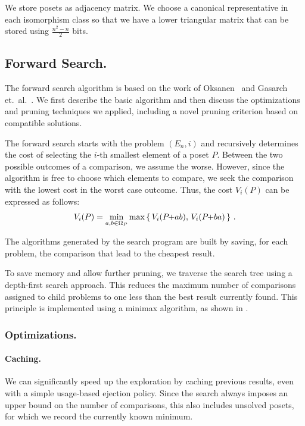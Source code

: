 \documentclass[twoside,leqno,twocolumn]{article}
\newcommand{\pchild}[3]{{#1}\kern-1pt{+}{#2}{#3}}
\begin{document}
We store posets as adjacency matrix.
We choose a canonical representative in each isomorphism class so that we have a lower triangular matrix that can be stored using $\frac{n^2 - n}{2}$ bits.


\subsection{Forward Search.} \label{chapter:forward_search}
The forward search algorithm is based on the work of Oksanen~\cite{Oksanen2006} and Gasarch et.\ al\@.~\cite{Gasarch1996}.
We first describe the basic algorithm and then discuss the optimizations and pruning techniques we applied, including a novel pruning criterion based on compatible solutions.

The forward search starts with the problem $(E_n, i)$ and recursively determines the cost of selecting the $i$-th smallest element of a poset $P$.
Between the two possible outcomes of a comparison, we assume the worse.
However, since the algorithm is free to choose which elements to compare, we seek the comparison with the lowest cost in the worst case outcome.
Thus, the cost $V_i(P)$ can be expressed as follows:
\begin{equation}
  V_i(P) = \min_{a,b \in \Omega_P} \max \left\{ \,V_i(\pchild{P}{a}{b}),\, V_i(\pchild{P}{b}{a})\,\right\}\,\text{.}
\end{equation}

The algorithms generated by the search program are built by saving, for each problem, the comparison that lead to the cheapest result.

To save memory and allow further pruning, we traverse the search tree using a depth-first search approach.
This reduces the maximum number of comparisons assigned to child problems to one less than the best result currently found.
This principle is implemented using a minimax algorithm, as shown in .


\subsubsection{Optimizations.}

\paragraph{Caching.}
We can significantly speed up the exploration by caching previous results, even with a simple usage-based ejection policy.
Since the search always imposes an upper bound on the number of comparisons, this also includes unsolved posets, for which we record the currently known minimum.
\end{document}

